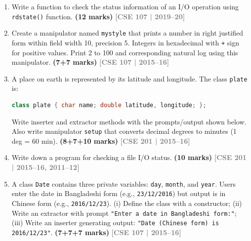 \documentclass[12pt,a3paper]{article}
\newcommand{\yr}[1]{\hfill\textcolor{gray}{\small\textbf{[#1]}}}
\newcommand{\mk}[1]{\textcolor{orange!70!black}{\small\textbf{(#1 marks)}}}
\begin{document}
\begin{enumerate}
\item Write a function to check the status information of an I/O operation using \texttt{rdstate()} function. \mk{12}
\yr{CSE 107 | 2019--20}





\item Create a manipulator named \texttt{mystyle} that prints a number in right justified form within field width 10, precision 5. Integers in hexadecimal with \texttt{+} sign for positive values. Print 2 to 100 and corresponding natural log using this manipulator. \mk{7+7}
\yr{CSE 107 | 2015--16}





\item A place on earth is represented by its latitude and longitude. The class \texttt{plate} is:
\begin{lstlisting}[language=C++]
class plate { char name; double latitude, longitude; };
\end{lstlisting}
Write inserter and extractor methods with the prompts/output shown below. Also write manipulator \texttt{setup} that converts decimal degrees to minutes (1 deg = 60 min). \mk{8+7+10}
\yr{CSE 201 | 2015--16}




\item Write down a program for checking a file I/O status. \mk{10}
\yr{CSE 201 | 2015--16, 2011--12}




\item A class \texttt{Date} contains three private variables: \texttt{day}, \texttt{month}, and \texttt{year}. Users enter the date in Bangladeshi form (e.g., \texttt{23/12/2016}) but output is in Chinese form (e.g., \texttt{2016/12/23}). (i) Define the class with a constructor; (ii) Write an extractor with prompt \texttt{"Enter a date in Bangladeshi form:"}; (iii) Write an inserter generating output: \texttt{"Date (Chinese form) is 2016/12/23"}. \mk{7+7+7}
\yr{CSE 107 | 2015--16}





\end{enumerate}
\end{document}
